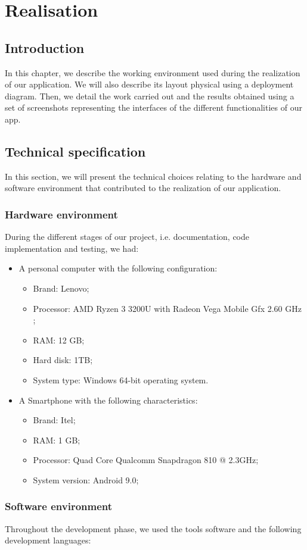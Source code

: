 \chapter{Realisation}
\section*{Introduction}
In this chapter, we describe the working environment used during
the realization of our application. We will also describe its layout
physical using a deployment diagram. Then, we
detail the work carried out and the results obtained using a set
of screenshots representing the interfaces of the different functionalities of
our app.
\section{Technical specification}
In this section, we will present the technical choices relating to
the hardware and software environment that contributed to the realization of our
application.
\subsection{Hardware environment}
During the different stages of our project, i.e. documentation,
code implementation and testing, we had:
\begin{itemize}
\item A personal computer with the following configuration:
\begin{itemize}
\item Brand: Lenovo;
\item Processor: AMD Ryzen 3 3200U with Radeon Vega Mobile Gfx 2.60 GHz ;
\item RAM: 12 GB;
\item Hard disk: 1TB;
\item System type: Windows 64-bit operating system.
\end{itemize} 
\item A Smartphone with the following characteristics:
\begin{itemize}
\item Brand: Itel;
\item RAM: 1 GB;
\item Processor: Quad Core Qualcomm Snapdragon 810 @ 2.3GHz;
\item System version: Android 9.0;
\end{itemize}
\end{itemize}
\subsection{Software environment}
Throughout the development phase, we used the tools
software and the following development languages:

